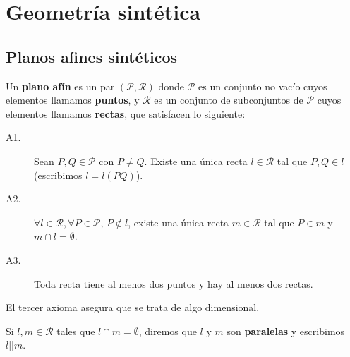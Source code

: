 \chapter{Geometría sintética}
\section{Planos afines sintéticos}
\begin{definition}
Un \textbf{plano afín} es un par $\displaystyle \left(\mathcal{P}, \mathcal{R}\right) $ donde $\displaystyle \mathcal{P} $ es un conjunto no vacío cuyos elementos llamamos \textbf{puntos}, y $\displaystyle \mathcal{R} $ es un conjunto de subconjuntos de $\displaystyle \mathcal{P} $ cuyos elementos llamamos \textbf{rectas}, que satisfacen lo siguiente:
\begin{description}
\item[A1.] Sean $\displaystyle P,Q \in \mathcal{P} $ con $\displaystyle P \neq Q $. Existe una única recta $\displaystyle l \in \mathcal{R} $ tal que $\displaystyle P,Q \in l $ (escribimos $\displaystyle l = l\left(PQ\right) $).
\item[A2.] $\displaystyle \forall l \in \mathcal{R}, \forall P \in \mathcal{P} $, $\displaystyle P \not\in l $, existe una única recta $\displaystyle m \in \mathcal{R} $ tal que $\displaystyle P \in m $ y $\displaystyle m \cap l = \emptyset $.
\item[A3.] Toda recta tiene al menos dos puntos y hay al menos dos rectas.
\end{description}
\end{definition}
\begin{observation}
El tercer axioma asegura que se trata de algo dimensional.
\end{observation}
\begin{definition}
Si $\displaystyle l, m \in \mathcal{R} $ tales que $\displaystyle l \cap m = \emptyset $, diremos que $\displaystyle l $ y $\displaystyle m $ son \textbf{paralelas} y escribimos $\displaystyle l||m $.
\end{definition}
